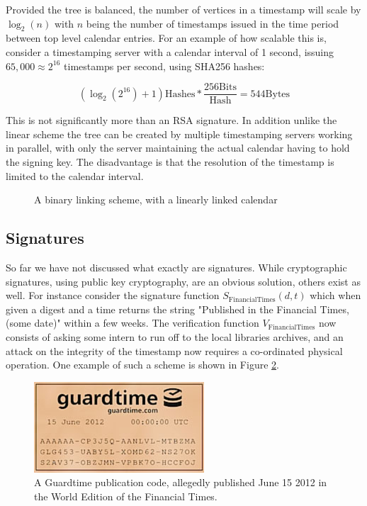 \documentclass{article}
\begin{document}
Provided the tree is balanced, the number of vertices in a timestamp will scale
by $\log_2 (n)$ with $n$ being the number of timestamps issued in the time
period between top level calendar entries. For an example of how scalable this
is, consider a timestamping server with a calendar interval of 1 second,
issuing $65,000 \approx 2^{16}$ timestamps per second, using SHA256 hashes:

\begin{equation}
(\log_2(2^{16})+1) \mathrm{Hashes} * \frac{256 \mathrm{Bits}}{\mathrm{Hash}} = 544
\mathrm{Bytes}
\end{equation}

This is not significantly more than an RSA signature. In addition unlike the
linear scheme the tree can be created by multiple timestamping servers working
in parallel, with only the server maintaining the actual calendar having to
hold the signing key. The disadvantage is that the resolution of the timestamp
is limited to the calendar interval.

\begin{figure}
    \centering
    
    \caption{A binary linking scheme, with a linearly linked calendar}
    \label{fig:three-level-merkle}
\end{figure}


\subsection{Signatures}

So far we have not discussed what exactly are signatures. While cryptographic
signatures, using public key cryptography, are an obvious solution, others
exist as well. For instance consider the signature function
$S_{\mathrm{Financial Times}}(d,t)$ which when given a digest and a time
returns the string "Published in the Financial Times, (some date)" within a few
weeks. The verification function $V_{\mathrm{Financial Times}}$ now consists of
asking some intern to run off to the local libraries archives, and an attack on
the integrity of the timestamp now requires a co-ordinated physical operation.
One example of such a scheme is shown in Figure \ref{fig:guardtime_20120615}.

\begin{figure}
    \centering
    \includegraphics{figures/guardtime_20120615.jpg}
    \caption{A Guardtime publication code, allegedly published June 15 2012 in
    the World Edition of the Financial Times.}
    \label{fig:guardtime_20120615}
\end{figure}
\end{document}
